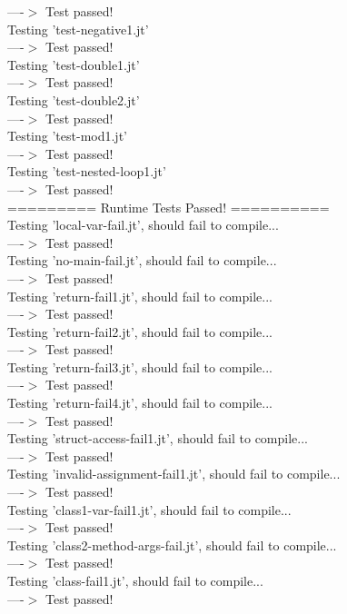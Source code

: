\documentclass{article}
\begin{document}
  ----$>$  Test passed!\\
Testing 'test-negative1.jt'\\
  ----$>$  Test passed!\\
Testing 'test-double1.jt'\\
  ----$>$  Test passed!\\
Testing 'test-double2.jt'\\
  ----$>$  Test passed!\\
Testing 'test-mod1.jt'\\
  ----$>$  Test passed!\\
Testing 'test-nested-loop1.jt'\\
  ----$>$  Test passed!\\
========= Runtime Tests Passed! ==========\\
Testing 'local-var-fail.jt', should fail to compile...\\
  ----$>$  Test passed!\\
Testing 'no-main-fail.jt', should fail to compile...\\
  ----$>$  Test passed!\\
Testing 'return-fail1.jt', should fail to compile...\\
  ----$>$  Test passed!\\
Testing 'return-fail2.jt', should fail to compile...\\
  ----$>$  Test passed!\\
Testing 'return-fail3.jt', should fail to compile...\\
  ----$>$  Test passed!\\
Testing 'return-fail4.jt', should fail to compile...\\
  ----$>$  Test passed!\\
Testing 'struct-access-fail1.jt', should fail to compile...\\
  ----$>$  Test passed!\\
Testing 'invalid-assignment-fail1.jt', should fail to compile...\\
  ----$>$  Test passed!\\
Testing 'class1-var-fail1.jt', should fail to compile...\\
  ----$>$  Test passed!\\
Testing 'class2-method-args-fail.jt', should fail to compile...\\
  ----$>$  Test passed!\\
Testing 'class-fail1.jt', should fail to compile...\\
  ----$>$  Test passed!\\
\end{document}
